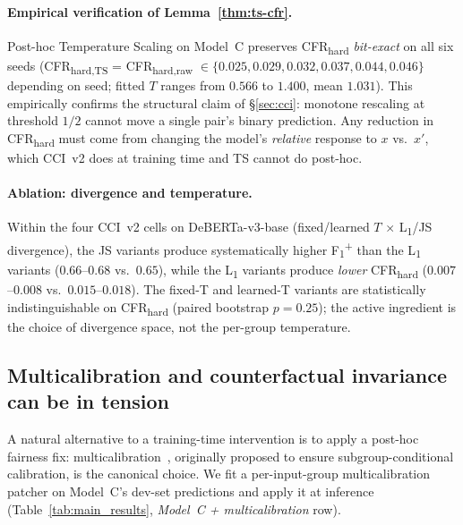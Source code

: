 \documentclass[10pt,a4paper]{article}
\begin{document}
\paragraph{Empirical verification of Lemma~\ref{thm:ts-cfr}.}
Post-hoc Temperature Scaling on Model~C preserves CFR\textsubscript{hard} \emph{bit-exact} on all six seeds (CFR\textsubscript{hard,TS} = CFR\textsubscript{hard,raw} $\in \{0.025, 0.029, 0.032, 0.037, 0.044, 0.046\}$ depending on seed; fitted $T$ ranges from $0.566$ to $1.400$, mean $1.031$). This empirically confirms the structural claim of \S\ref{sec:cci}: monotone rescaling at threshold $1/2$ cannot move a single pair's binary prediction. Any reduction in CFR\textsubscript{hard} must come from changing the model's \emph{relative} response to $x$ vs.\ $x'$, which CCI~v2 does at training time and TS cannot do post-hoc.

\paragraph{Ablation: divergence and temperature.}
Within the four CCI~v2 cells on DeBERTa-v3-base (fixed/learned $T$ $\times$ L\textsubscript{1}/JS divergence), the JS variants produce systematically higher F\textsubscript{1}\textsuperscript{+} than the L\textsubscript{1} variants ($0.66$--$0.68$ vs.\ $0.65$), while the L\textsubscript{1} variants produce \emph{lower} CFR\textsubscript{hard} ($0.007$--$0.008$ vs.\ $0.015$--$0.018$). The fixed-T and learned-T variants are statistically indistinguishable on CFR\textsubscript{hard} (paired bootstrap $p = 0.25$); the active ingredient is the choice of divergence space, not the per-group temperature.

\subsection{Multicalibration and counterfactual invariance can be in tension}
\label{sec:multicalibration_tension}

A natural alternative to a training-time intervention is to apply a post-hoc fairness fix: multicalibration~\citep{hebertjohnson2018multicalibration}, originally proposed to ensure subgroup-conditional calibration, is the canonical choice. We fit a per-input-group multicalibration patcher on Model~C's dev-set predictions and apply it at inference (Table~\ref{tab:main_results}, \emph{Model~C + multicalibration} row).
\end{document}
